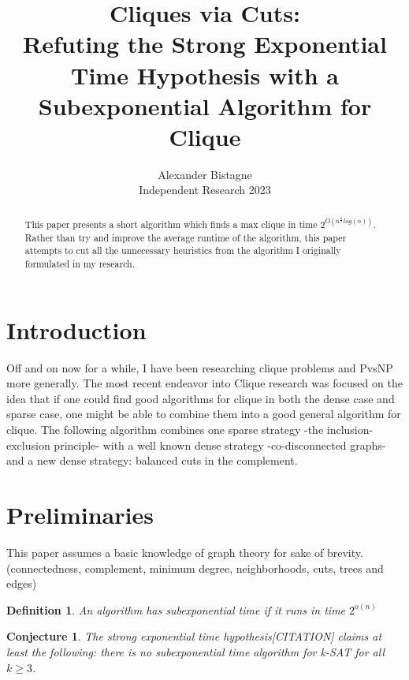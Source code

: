 \documentclass[12pt]{article}
\newtheorem{conj}[thm]{Conjecture}
\newtheorem{mydef}[thm]{Definition}
\begin{document}
\title{Cliques via Cuts: \\ Refuting the Strong Exponential Time Hypothesis with a Subexponential Algorithm for Clique}

\author{Alexander Bistagne \\ 
Independent Research 2023}

\maketitle

\begin{abstract}
  This paper presents a short algorithm which finds a max clique in time $2^{ O(n^{\frac{2}{3}}log(n)) } $. Rather than try and improve the average runtime of the algorithm, this paper attempts to cut all the unnecessary heuristics from the algorithm I originally formulated in my research.

\end{abstract}


\section{Introduction}
Off and on now for a while, I have been researching clique problems and PvsNP more generally. The most recent endeavor into Clique research was focused on the idea that if one could find good algorithms for clique in both the dense case and sparse case, one might be able to combine them into a good general algorithm for clique. The following algorithm combines one sparse strategy -the inclusion-exclusion principle- with a well known dense strategy -co-disconnected graphs- and a new dense strategy: balanced cuts in the complement.


\section{Preliminaries}

This paper assumes a basic knowledge of graph theory for sake of brevity. (connectedness, complement, minimum degree, neighborhoods, cuts, trees and edges)

\begin{mydef} An algorithm has subexponential time if it runs in time $2^{o(n)}$ \end{mydef}

\begin{conj} The strong exponential time hypothesis[CITATION] claims at least the following: there is no subexponential time algorithm for k-SAT for all $k \ge 3$.\end{conj}
\end{document}
